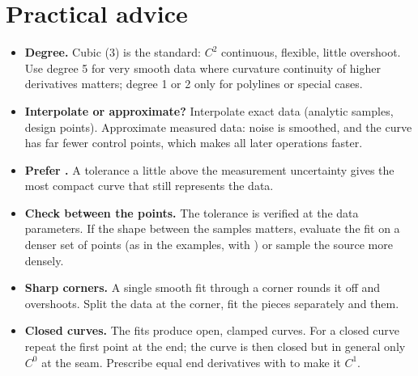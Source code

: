 \section{Practical advice}\label{sec:fitting-advice}

\begin{itemize}
\item \textbf{Degree.} Cubic (3) is the standard: $C^2$ continuous, flexible, little overshoot.
  Use degree 5 for very smooth data where curvature continuity of higher derivatives matters;
  degree 1 or 2 only for polylines or special cases.
\item \textbf{Interpolate or approximate?} Interpolate exact data (analytic samples, design
  points). Approximate measured data: noise is smoothed, and the curve has far fewer control
  points, which makes all later operations faster.
\item \textbf{Prefer .} A tolerance a little above the measurement
  uncertainty gives the most compact curve that still represents the data.
\item \textbf{Check between the points.} The tolerance is verified at the data parameters. If the
  shape between the samples matters, evaluate the fit on a denser set of points (as in the
  examples, with ) or sample the source more densely.
\item \textbf{Sharp corners.} A single smooth fit through a corner rounds it off and overshoots.
  Split the data at the corner, fit the pieces separately and  them.
\item \textbf{Closed curves.} The fits produce open, clamped curves. For a closed curve repeat
  the first point at the end; the curve is then closed but in general only $C^0$ at the seam.
  Prescribe equal end derivatives with  to make it $C^1$.
\end{itemize}

